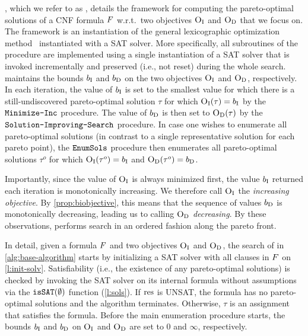 , which we refer to as \algname{}, details the  framework for computing the pareto-optimal solutions of a CNF formula $F$ w.r.t.\ two objectives $\textsc{O}_{\text{I}}$ and $\textsc{O}_{\text{D}}$ that we focus on.
The framework is an instantiation of the general lexicographic optimization method~\autocite{survey} instantiated with a SAT solver.
More specifically, all subroutines of the procedure are implemented using a single instantiation of a SAT solver that is invoked incrementally and preserved (i.e., not reset) during the whole search. 
\algname{} maintains the bounds $b_{\text{I}}$ and $b_{\text{D}}$ on the two objectives $\textsc{O}_{\text{I}}$ and $\textsc{O}_{\text{D}}$, respectively.
In each iteration, the value of $b_{\text{I}}$ is set to the smallest value for which there is a still-undiscovered pareto-optimal solution $\tau$ for which $\textsc{O}_{\text{I}}(\tau) = b_{\text{I}}$ by the $\texttt{Minimize-\allowbreak{}Inc}$ procedure.
The value of $b_{\text{D}}$ is then set to $\textsc{O}_{\text{D}}(\tau)$ by the $\texttt{Solution-\allowbreak{}Improving-\allowbreak{}Search}$ procedure.
In case one wishes to enumerate all pareto-optimal solutions (in contrast to a single representative solution for each pareto point), the $\texttt{EnumSols}$ procedure then enumerates all pareto-optimal solutions $\tau^o$ for which $\textsc{O}_{\text{I}}(\tau^o) = b_{\text{I}}$ and $\textsc{O}_{\text{D}}(\tau^o) = b_{\text{D}}$.

Importantly, since the value of $\textsc{O}_{\text{I}}$ is always minimized first, the value $b_{\text{I}}$ returned each iteration is monotonically increasing. 
We therefore call $\textsc{O}_{\text{I}}$ the \emph{increasing objective}.
By \cref{prop:biobjective}, this means that the sequence of values $b_{\text{D}}$ is monotonically decreasing, leading us to calling $\textsc{O}_{\text{D}}$ \emph{decreasing}.
By these observations, \algname{} performs search in an ordered fashion along the pareto front.

In detail, given a formula $F$ and two objectives $\textsc{O}_{\text{I}}$ and $\textsc{O}_{\text{D}}$, the search of \algname{} in \cref{alg:base-algorithm} starts by initializing a SAT solver with all clauses in $F$ on \cref{l:init-solv}.
Satisfiability (i.e., the existence of any pareto-optimal solutions) is checked by invoking the SAT solver on its internal formula without assumptions via the $\texttt{isSAT}(\emptyset)$ function (\cref{l:sols}).
If $\text{res}$ is UNSAT, the formula has no pareto-optimal solutions and the algorithm terminates.
Otherwise, $\tau$ is an assignment that satisfies the formula.
Before the main enumeration procedure starts, the bounds $b_{\text{I}}$ and $b_{\text{D}}$ on $\textsc{O}_{\text{I}}$ and $\textsc{O}_{\text{D}}$ are set to $0$ and $\infty$, respectively.

